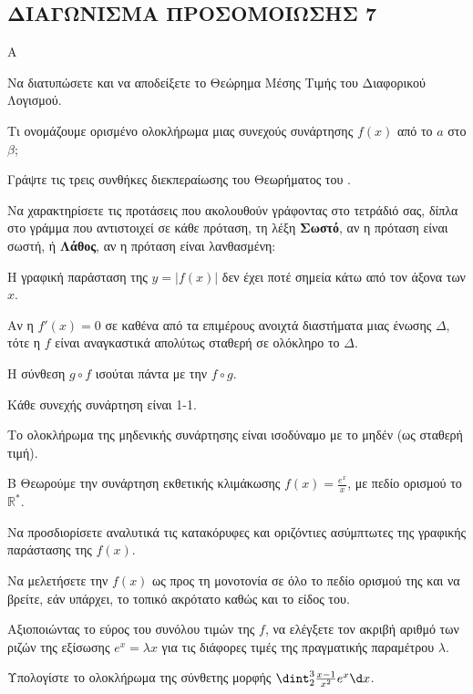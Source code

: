 \newpage
\subsection{ΔΙΑΓΩΝΙΣΜΑ ΠΡΟΣΟΜΟΙΩΣΗΣ 7}
\begin{thema}{Α}
\begin{erwthma}
    \item Να διατυπώσετε και να αποδείξετε το Θεώρημα Μέσης Τιμής του Διαφορικού Λογισμού. 
    \item Τι ονομάζουμε ορισμένο ολοκλήρωμα μιας συνεχούς συνάρτησης $f(x)$ από το $a$ στο $\beta$; 
    \item Γράψτε τις τρεις συνθήκες διεκπεραίωσης του Θεωρήματος του . 
    \item Να χαρακτηρίσετε τις προτάσεις που ακολουθούν γράφοντας στο τετράδιό σας, δίπλα στο γράμμα που αντιστοιχεί σε κάθε πρόταση, τη λέξη \textbf{Σωστό},
αν η πρόταση είναι σωστή, ή \textbf{Λάθος}, αν η πρόταση είναι λανθασμένη:
    \begin{alist}
        \item Η γραφική παράσταση της $y = |f(x)|$ δεν έχει ποτέ σημεία κάτω από τον άξονα των $x$.
        \item Αν η $f'(x) = 0$ σε καθένα από τα επιμέρους ανοιχτά διαστήματα μιας ένωσης $\Delta$, τότε η $f$ είναι αναγκαστικά απολύτως σταθερή σε ολόκληρο το $\Delta$.
        \item Η σύνθεση $g \circ f$ ισούται πάντα με την $f \circ g$.
        \item Κάθε συνεχής συνάρτηση είναι 1-1.
        \item Το ολοκλήρωμα της μηδενικής συνάρτησης είναι ισοδύναμο με το μηδέν (ως σταθερή τιμή).
    \end{alist} 
\end{erwthma}
\end{thema}

\begin{thema}{Β}
Θεωρούμε την συνάρτηση εκθετικής κλιμάκωσης $f(x) = \frac{e^x}{x}$, με πεδίο ορισμού το $\mathbb{R}^*$.
\begin{erwthma}
    \item Να προσδιορίσετε αναλυτικά τις κατακόρυφες και οριζόντιες ασύμπτωτες της γραφικής παράστασης της $f(x)$. 
    \item Να μελετήσετε την $f(x)$ ως προς τη μονοτονία σε όλο το πεδίο ορισμού της και να βρείτε, εάν υπάρχει, το τοπικό ακρότατο καθώς και το είδος του. 
    \item Αξιοποιώντας το εύρος του συνόλου τιμών της $f$, να ελέγξετε τον ακριβή αριθμό των ριζών της εξίσωσης $e^x = \lambda x$ για τις διάφορες τιμές της πραγματικής παραμέτρου $\lambda$. 
    \item Υπολογίστε το ολοκλήρωμα της σύνθετης μορφής $\dint_2^3 \frac{x-1}{x^2} e^x \d x$. 
\end{erwthma}
\end{thema}

